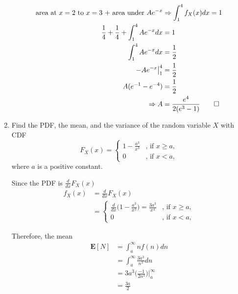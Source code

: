 \documentclass[paper=usletter, fontsize=12pt]{article}
\begin{document}
\begin{enumerate}
\begin{cproof}
            \begin{align*}
                \text{area at $x=2$ to $x=3$ + area under $Ae^{-x}$} & \Rightarrow \int_{1}^{4}f_X(x)dx =1 \\
                \frac{1}{4} + \frac{1}{4} + \int_{1}^{4}Ae^{-x}dx & = 1\\
                \int_{1}^{4}Ae^{-x}dx & = \frac{1}{2}\\
                -Ae^{-x}\big\vert_{1}^{4} & = \frac{1}{2} \\
                A(e^{-1}-e^{-4}) & = \frac{1}{2} \\
                \Rightarrow A & = \frac{e^4}{2(e^3-1)} \qedhere
            \end{align*}
            \endgroup

        \end{cproof}

        \item Find the PDF, the mean, and the variance of the random variable
        $X$ with CDF
        \begin{equation*}
            F_X(x) =
            \begin{cases}
                1-\frac{a^3}{x^3} & \text{, if } x \ge a,\\
                0 & \text{, if } x < a,
            \end{cases}
        \end{equation*}
        \endgroup
        where $a$ is a positive constant.
        \begin{cproof}
            Since the PDF is $\frac{d}{dx}F_X(x)$
            \begin{align*}
                f_X(x) & = \frac{d}{dx}F_X(x) \\
                & =
                \begin{cases}
                    \frac{d}{dx}\big(1-\frac{a^3}{x^3}\big)=\frac{3a^3}{x^4} & \text{, if } x \ge a,\\
                    0 & \text{, if } x < a,
                \end{cases}
            \end{align*}

            Therefore, the mean
            \begin{align*}
                \textbf{E}[N] & = \int_{a}^{\infty}nf(n)dn \\
                & = \int_{a}^{\infty}\frac{3a^3}{n^3}dn\\
                & = 3a^3\bigg(\frac{-1}{2n^2}\bigg)\bigg\vert_{a}^{\infty}\\
                & = \frac{3a}{2}
            \end{align*}
            \endgroup


\end{cproof}
\end{enumerate}
\end{document}
